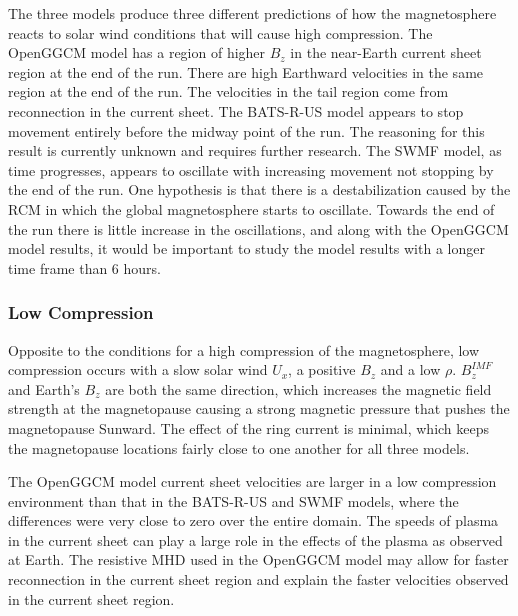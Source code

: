 The three models produce three different predictions of how the
magnetosphere reacts to solar wind conditions that will cause high compression. The OpenGGCM model has a region of higher $B_z$ in the near-Earth
current sheet region at the end of the run. There are high Earthward velocities
in the same region at the end of the run.  The velocities in the tail
region come from reconnection in the current sheet. The BATS-R-US model appears to stop movement entirely before the midway point
of the run. The reasoning for this result is currently unknown and requires
further research.  The SWMF model, as time progresses, appears to oscillate with increasing
movement not stopping by the end of the run. One hypothesis is that there is a
destabilization caused by the RCM in which the global magnetosphere starts to
oscillate. Towards the end of the run there is little increase in the
oscillations, and along with the OpenGGCM model results, it would be important to
study the model results with a longer time frame than 6 hours.

\subsubsection{Low Compression}
Opposite to the conditions for a high compression of the magnetosphere, low
compression occurs with a slow solar wind $U_x$, a
positive $B_z$ and a low $\rho$. $B_z^{IMF}$ and Earth's $B_z$ are both the
same direction, which increases the magnetic field strength at the magnetopause
causing a strong magnetic pressure that pushes the magnetopause Sunward. The
effect of the ring current is minimal, which keeps the magnetopause locations
fairly close to one another for all three models.

The OpenGGCM model current sheet velocities are larger in a low compression
environment than that in the BATS-R-US and SWMF models, where the differences were very
close to zero over the entire domain. The speeds of plasma in the current
sheet can play a large role in the effects of the plasma as observed at Earth.
The resistive MHD used in the OpenGGCM model may allow for faster reconnection in the current sheet region and explain the faster
velocities observed in the current sheet region.

